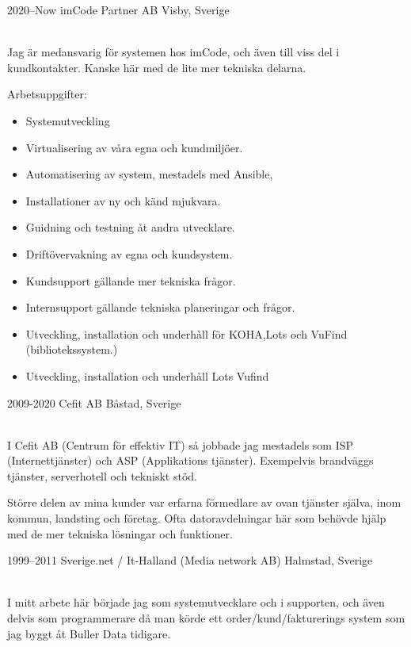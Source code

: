 \documentclass[]{cv-style}          %
\begin{document}
\begin{entrylist}
\entry
  {2020--Now}
  {imCode Partner AB}
  {Visby, Sverige}
  {\\
  Jag är medansvarig för systemen hos imCode, och även till viss del i
  kundkontakter. Kanske här med de lite mer tekniska delarna.
  
    Arbetsuppgifter:
  \begin{itemize}
    \item Systemutveckling
    \item Virtualisering av våra egna och kundmiljöer.
    \item Automatisering av system, mestadels med Ansible,
    \item Installationer av ny och känd mjukvara.
    \item Guidning och testning åt andra utvecklare.
    \item Driftövervakning av egna och kundsystem.
    \item Kundsupport gällande mer tekniska frågor.
    \item Internsupport gällande tekniska planeringar och frågor.
    \item Utveckling, installation och underhåll för KOHA,Lots och VuFind (bibliotekssystem.)
    \item Utveckling, installation och underhåll Lots Vufind

  \end{itemize}
  }
\entry
  {2009-2020}
  {Cefit AB}
  {Båstad, Sverige}
  {\\
      I Cefit AB (Centrum för effektiv IT) så jobbade jag mestadels som 
      ISP (Internettjänster) och ASP (Applikations tjänster). Exempelvis
      brandväggs tjänster, serverhotell och tekniskt stöd.

      Större delen av mina kunder var erfarna förmedlare av ovan tjänster
      själva, inom kommun, landsting och företag. Ofta datoravdelningar 
      här som behövde hjälp med de mer tekniska lösningar och funktioner.
      
}   
\entry
  {1999--2011}
  {Sverige.net / It-Halland (Media network AB)}
  {Halmstad, Sverige}
  {\\
    I mitt arbete här började jag som systemutvecklare och i supporten, och även delvis
    som programmerare då man körde ett order/kund/fakturerings system som jag byggt 
    åt Buller Data tidigare.

}
\end{entrylist}
\end{document}

